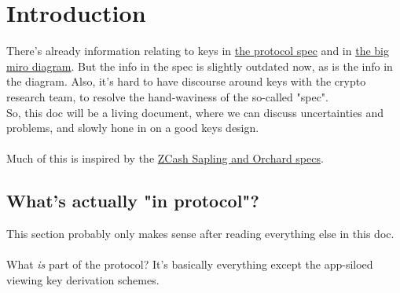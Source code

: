 \section{Introduction}
\label{sec:intro}

There's already information relating to keys in \href{https://docs.aztec.network/protocol-specs/addresses-and-keys}{the protocol spec} and in \href{https://miro.com/app/board/uXjVNgnoW40=/}{the big miro diagram}. But the info in the spec is slightly outdated now, as is the info in the diagram. Also, it's hard to have discourse around keys with the crypto research team, to resolve the hand-waviness of the so-called "spec".\\
So, this doc will be a living document, where we can discuss uncertainties and problems, and slowly hone in on a good keys design.\\
\\
Much of this is inspired by the \href{https://zips.z.cash/protocol/protocol.pdf}{ZCash Sapling and Orchard specs}.


\subsection{What's actually "in protocol"?}

This section probably only makes sense after reading everything else in this doc.\\
\\
What \textit{is} part of the protocol? It's basically everything except the app-siloed viewing key derivation schemes.

